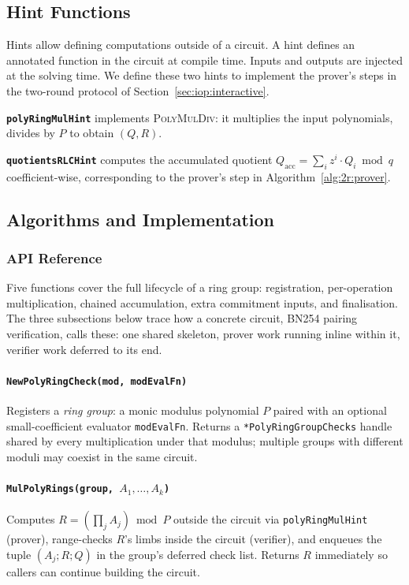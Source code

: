 \subsection{Hint Functions}
\label{sec:prt:hints}

Hints allow defining computations outside of a circuit. A hint defines an
annotated function in the circuit at compile time. Inputs and outputs are
injected at the solving time. We define these two hints to implement the 
prover's steps in the two-round protocol of Section~\ref{sec:iop:interactive}.

\textbf{\texttt{polyRingMulHint}} implements \textsc{PolyMulDiv}: it multiplies the input polynomials, divides
by $P$ to obtain $(Q, R)$.

\textbf{\texttt{quotientsRLCHint}} computes the accumulated quotient
$Q_{\mathrm{acc}} = \sum_{i} z^i \cdot Q_i \bmod q$ coefficient-wise,
corresponding to the prover's step in Algorithm~\ref{alg:2r:prover}.

\subsection{Algorithms and Implementation}
\label{sec:prt:api}

\subsubsection{API Reference}

Five functions cover the full lifecycle of a ring group: registration, per-operation multiplication, chained accumulation, extra commitment inputs, and finalisation. The three subsections below trace how a concrete circuit, BN254 pairing verification, calls these: one shared skeleton, prover work running inline within it, verifier work deferred to its end.

\paragraph{\texttt{NewPolyRingCheck(mod, modEvalFn)}}
Registers a \emph{ring group}: a monic modulus polynomial $P$ paired with an optional
small-coefficient evaluator \texttt{modEvalFn}.  Returns a
\texttt{*PolyRingGroupChecks} handle shared by every multiplication under that
modulus; multiple groups with different moduli may coexist in the same circuit.

\paragraph{\texttt{MulPolyRings(group, $A_1,\ldots,A_k$)}}
Computes $R = (\prod_j A_j) \bmod P$ outside the circuit via
\texttt{polyRingMulHint} (prover), range-checks $R$'s limbs inside the circuit
(verifier), and enqueues the tuple $(A_j; R; Q)$ in the group's deferred check
list.  Returns $R$ immediately so callers can continue building the circuit.


